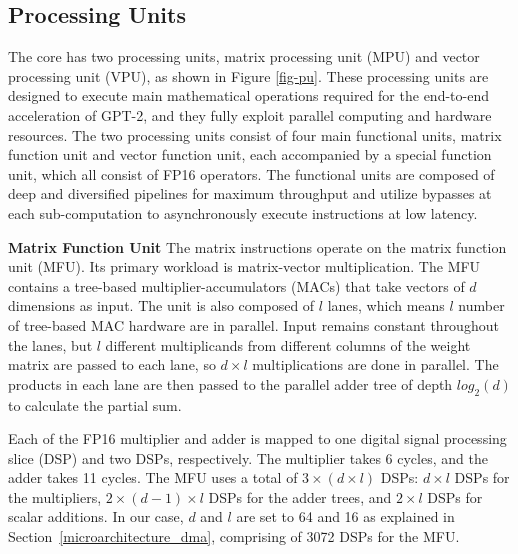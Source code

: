\subsection{Processing Units} \label{microarchitecture_pu}
The \sysname{} core has two processing units, matrix processing unit (MPU) and vector processing unit (VPU), as shown in Figure \ref{fig-pu}. These processing units are designed to execute main mathematical operations required for the end-to-end acceleration of GPT-2, and they fully exploit parallel computing and hardware resources. The two processing units consist of four main functional units, matrix function unit and vector function unit, each accompanied by a special function unit, which all consist of FP16 operators. The functional units are composed of deep and diversified pipelines for maximum throughput and utilize bypasses at each sub-computation to asynchronously execute instructions at low latency. 


\textbf{Matrix Function Unit} The matrix instructions operate on the matrix function unit (MFU). Its primary workload is matrix-vector multiplication. The MFU contains a tree-based multiplier-accumulators (MACs) that take vectors of $d$ dimensions as input. The unit is also composed of $l$ lanes, which means $l$ number of tree-based MAC hardware are in parallel. Input remains constant throughout the lanes, but $l$ different multiplicands from different columns of the weight matrix are passed to each lane, so $d \times l$ multiplications are done in parallel. %
The products in each lane are then passed to the parallel adder tree of depth $log_2(d)$ to calculate the partial sum. 

Each of the FP16 multiplier and adder is mapped to one digital signal processing slice (DSP) and two DSPs, respectively. The multiplier takes 6 cycles, and the adder takes 11 cycles. The MFU uses a total of $3\times(d \times l)$ DSPs: $d \times l$ DSPs for the multipliers, $2 \times (d-1) \times l$ DSPs for the adder trees, and $2 \times l$ DSPs for scalar additions.
In our case, $d$ and $l$ are set to 64 and 16 as explained in Section~\ref{microarchitecture_dma}, comprising of 3072 DSPs for the MFU.


